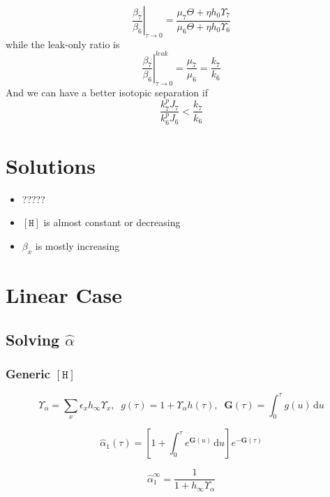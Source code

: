 \documentclass[aps,onecolumn,12pt]{revtex4}
\newcommand{\mychem}[1]{\mathtt{#1}}
\newcommand{\myconc}[1]{\left\lbrack{#1}\right\rbrack}
\newcommand{\spproton}{\mychem{H}}
\newcommand{\proton}{\myconc{\spproton}}
\newcommand{\ig}{\ensuremath{\mathbf{G}}}
\begin{document}
\begin{equation}
	\left.\dfrac{\beta_7}{\beta_6}\right|_{\tau\to0} = \dfrac{\mu_7 \Theta + \eta h_0 \Upsilon_7 }{\mu_6 \Theta + \eta h_0 \Upsilon_6 }
\end{equation}
while the leak-only ratio is
\begin{equation}
	\left.\dfrac{\beta_7}{\beta_6}\right|_{\tau\to0}^{leak} = \dfrac{\mu_7}{\mu_6} = \dfrac{k_7}{k_6}
\end{equation}
And we can have a better isotopic separation if
\begin{equation}
\dfrac{k_7^pJ_7}{k_6^pJ_6}<\dfrac{k_7}{k_6}
\end{equation}


\section{Solutions}

\begin{itemize}
\item ?????
\item $\proton$ is almost constant or decreasing
\item $\beta_x$ is mostly increasing
\end{itemize}

\section{Linear Case}

\subsection{Solving $\hat\alpha$}

\subsubsection{Generic $\proton$}

\begin{equation}
	\Upsilon_\alpha = \sum_x \epsilon_x h_\infty \Upsilon_x,\;\;g(\tau) = 1+\Upsilon_\alpha h(\tau), \;\; \ig(\tau) = \int_0^\tau g(u) \, \mathrm{d} u
\end{equation}

\begin{equation}
	\hat\alpha_1(\tau) = \left[ 1 + \int_0^{\tau} e^{\ig(u)}\,\mathrm{d} u\right] e^{-\ig(\tau)}
\end{equation}

\begin{equation}
	\hat\alpha_1^\infty = \dfrac{1}{1+h_\infty \Upsilon_\alpha}
\end{equation}
\end{document}
